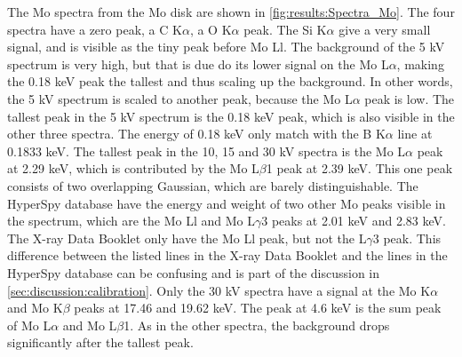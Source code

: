 The Mo spectra from the Mo disk are shown in \cref{fig:results:Spectra_Mo}.
The four spectra have a zero peak, a C K$\alpha$, a O K$\alpha$ peak.
The Si K$\alpha$ give a very small signal, and is visible as the tiny peak before Mo Ll.
The background of the 5 kV spectrum is very high, but that is due do its lower signal on the Mo L$\alpha$, making the 0.18 keV peak the tallest and thus scaling up the background.
In other words, the 5 kV spectrum is scaled to another peak, because the Mo L$\alpha$ peak is low. %
The tallest peak in the 5 kV spectrum is the 0.18 keV peak, which is also visible in the other three spectra.
The energy of 0.18 keV only match with the B K$\alpha$ line at 0.1833 keV. %
The tallest peak in the 10, 15 and 30 kV spectra is the Mo L$\alpha$ peak at 2.29 keV, which is contributed by the Mo L$\beta$1 peak at 2.39 keV.
This one peak consists of two overlapping Gaussian, which are barely distinguishable.
The HyperSpy database have the energy and weight of two other Mo peaks visible in the spectrum, which are the Mo Ll and Mo L$\gamma$3 peaks at 2.01 keV and 2.83 keV.
%
%
The X-ray Data Booklet only have the Mo Ll peak, but not the L$\gamma$3 peak.
This difference between the listed lines in the X-ray Data Booklet and the lines in the HyperSpy database can be confusing and is part of the discussion in \cref{sec:discussion:calibration}. %
Only the 30 kV spectra have a signal at the Mo K$\alpha$ and Mo K$\beta$ peaks at 17.46 and 19.62 keV. %
The peak at 4.6 keV is the sum peak of Mo L$\alpha$ and Mo L$\beta$1.
As in the other spectra, the background drops significantly after the tallest peak.


